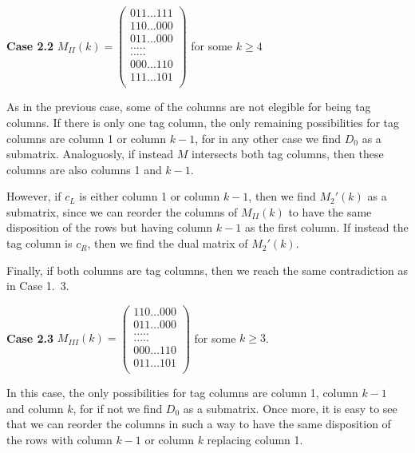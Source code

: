 \documentclass[a4paper,10pt]{report}
\theoremstyle{plain}
\theoremstyle{remark}
\theoremstyle{plain}
\begin{document}
{\vspace{2mm}
\textbf{Case 2.2}  $M_{II}(k) = \begin{pmatrix}
				011...111\\
				110...000\\
				011...000\\
				.   .   .   .   . \\
				.   .   .   .   . \\
				000...110\\
				111...101\\
			\end{pmatrix}$ for some $k \geq 4$

\vspace{2mm}
As in the previous case, some of the columns are not elegible for being tag columns. If there is only one tag column, the only remaining possibilities for tag columns are column 1 or column $k-1$, for in any other case we find $D_0$ as a submatrix. Analoguosly, if instead $M$ intersects both tag columns, then these columns are also columns 1 and $k-1$.

However, if $c_L$ is either column 1 or column $k-1$, then we find $M_2'(k)$ as a submatrix, since we can reorder the columns of $M_{II}(k)$ to have the same disposition of the rows but having column $k-1$ as the first column.
If instead the tag column is $c_R$, then we find the dual matrix of $M_2'(k)$. 

Finally, if both columns are tag columns, then we reach the same contradiction as in Case 1.\ 3.
 
\vspace{2mm}
\textbf{Case 2.3} $M_{III}(k)= \begin{pmatrix}
				110...000\\
				011...000\\
				.   .   .   .   . \\
				.   .   .   .   . \\
				000...110\\
				011...101\\
			\end{pmatrix}$ for some $k \geq 3$.
		
\vspace{2mm}
In this case, the only possibilities for tag columns are column 1, column $k-1$ and column $k$, for if not we find $D_0$ as a submatrix. Once more, it is easy to see that we can reorder the columns in such a way to have the same disposition of the rows with column $k-1$ or column $k$ replacing column 1.

}
\end{document}
